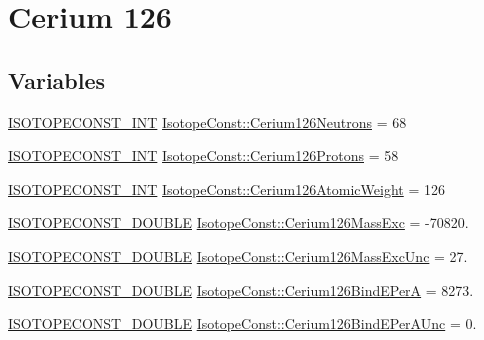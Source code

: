 \hypertarget{group___isotope_const-_cerium-_ce126}{}\section{Cerium 126}
\label{group___isotope_const-_cerium-_ce126}
\subsection*{Variables}
\begin{DoxyCompactItemize}
\item 
\mbox{\hyperlink{group___isotope_const-_macros_ga5f18360b3e99483a35c32d789e62621c}{I\+S\+O\+T\+O\+P\+E\+C\+O\+N\+S\+T\+\_\+\+I\+NT}} \mbox{\hyperlink{group___isotope_const-_cerium-_ce126_ga03dabde6385c4837b84af619f3691e00}{Isotope\+Const\+::\+Cerium126\+Neutrons}} = 68
\item 
\mbox{\hyperlink{group___isotope_const-_macros_ga5f18360b3e99483a35c32d789e62621c}{I\+S\+O\+T\+O\+P\+E\+C\+O\+N\+S\+T\+\_\+\+I\+NT}} \mbox{\hyperlink{group___isotope_const-_cerium-_ce126_ga101c638b298f0f6443d8eeda1ccfd9a2}{Isotope\+Const\+::\+Cerium126\+Protons}} = 58
\item 
\mbox{\hyperlink{group___isotope_const-_macros_ga5f18360b3e99483a35c32d789e62621c}{I\+S\+O\+T\+O\+P\+E\+C\+O\+N\+S\+T\+\_\+\+I\+NT}} \mbox{\hyperlink{group___isotope_const-_cerium-_ce126_ga768b29d406a1ebce80e4b4f51a12af5d}{Isotope\+Const\+::\+Cerium126\+Atomic\+Weight}} = 126
\item 
\mbox{\hyperlink{group___isotope_const-_macros_ga8f45a7272ce02c0b4c65c44636ed719a}{I\+S\+O\+T\+O\+P\+E\+C\+O\+N\+S\+T\+\_\+\+D\+O\+U\+B\+LE}} \mbox{\hyperlink{group___isotope_const-_cerium-_ce126_ga34e0b01c910c09c519913cc8c7d53665}{Isotope\+Const\+::\+Cerium126\+Mass\+Exc}} = -\/70820.
\item 
\mbox{\hyperlink{group___isotope_const-_macros_ga8f45a7272ce02c0b4c65c44636ed719a}{I\+S\+O\+T\+O\+P\+E\+C\+O\+N\+S\+T\+\_\+\+D\+O\+U\+B\+LE}} \mbox{\hyperlink{group___isotope_const-_cerium-_ce126_ga19361bccce5c1f1f04e64427d04d6c84}{Isotope\+Const\+::\+Cerium126\+Mass\+Exc\+Unc}} = 27.
\item 
\mbox{\hyperlink{group___isotope_const-_macros_ga8f45a7272ce02c0b4c65c44636ed719a}{I\+S\+O\+T\+O\+P\+E\+C\+O\+N\+S\+T\+\_\+\+D\+O\+U\+B\+LE}} \mbox{\hyperlink{group___isotope_const-_cerium-_ce126_ga972639953c24e0d057480703be8d19d2}{Isotope\+Const\+::\+Cerium126\+Bind\+E\+PerA}} = 8273.
\item 
\mbox{\hyperlink{group___isotope_const-_macros_ga8f45a7272ce02c0b4c65c44636ed719a}{I\+S\+O\+T\+O\+P\+E\+C\+O\+N\+S\+T\+\_\+\+D\+O\+U\+B\+LE}} \mbox{\hyperlink{group___isotope_const-_cerium-_ce126_ga162c8f803e1bfb506247a264311086cb}{Isotope\+Const\+::\+Cerium126\+Bind\+E\+Per\+A\+Unc}} = 0.

\end{DoxyCompactItemize}
